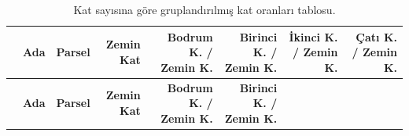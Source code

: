 \documentclass[12pt,turkish,a4paperpaper,]{report}
\begin{document}
\begin{longtable}[]{@{}lrrrrrrr@{}}
\caption{Kat sayısına göre gruplandırılmış kat oranları tablosu.
\label{katoranlari}}\tabularnewline
\toprule
\begin{minipage}[b]{0.02\columnwidth}\raggedright
\strut
\end{minipage} & \begin{minipage}[b]{0.04\columnwidth}\raggedleft
\textbf{Ada}\strut
\end{minipage} & \begin{minipage}[b]{0.04\columnwidth}\raggedleft
\textbf{Parsel}\strut
\end{minipage} & \begin{minipage}[b]{0.14\columnwidth}\raggedleft
\textbf{Zemin Kat}\strut
\end{minipage} & \begin{minipage}[b]{0.14\columnwidth}\raggedleft
\textbf{Bodrum K. / Zemin K.}\strut
\end{minipage} & \begin{minipage}[b]{0.14\columnwidth}\raggedleft
\textbf{Birinci K. / Zemin K.}\strut
\end{minipage} & \begin{minipage}[b]{0.14\columnwidth}\raggedleft
\textbf{İkinci K. / Zemin K.}\strut
\end{minipage} & \begin{minipage}[b]{0.12\columnwidth}\raggedleft
\textbf{Çatı K. / Zemin K.}\strut
\end{minipage}\tabularnewline
\midrule
\endfirsthead
\toprule
\begin{minipage}[b]{0.02\columnwidth}\raggedright
\strut
\end{minipage} & \begin{minipage}[b]{0.04\columnwidth}\raggedleft
\textbf{Ada}\strut
\end{minipage} & \begin{minipage}[b]{0.04\columnwidth}\raggedleft
\textbf{Parsel}\strut
\end{minipage} & \begin{minipage}[b]{0.14\columnwidth}\raggedleft
\textbf{Zemin Kat}\strut
\end{minipage} & \begin{minipage}[b]{0.14\columnwidth}\raggedleft
\textbf{Bodrum K. / Zemin K.}\strut
\end{minipage} & \begin{minipage}[b]{0.14\columnwidth}\raggedleft
\textbf{Birinci K. / Zemin K.}\strut
\end{minipage} & \begin{minipage}[b]{0.14\columnwidth}\raggedleft

\end{minipage}
\end{longtable}
\end{document}
